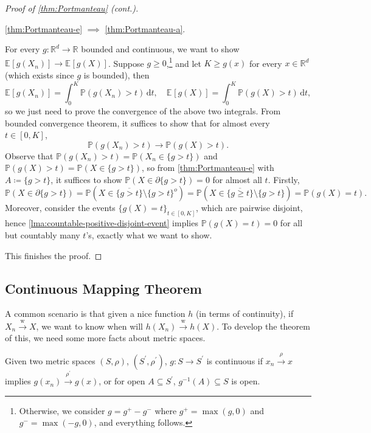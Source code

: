 \begin{proof}[Proof of \autoref{thm:Portmanteau} (cont.)]
	\begin{claim}
		\autoref{thm:Portmanteau-e} \(\implies \) \autoref{thm:Portmanteau-a}.
	\end{claim}
	\begin{explanation}
		For every \(g \colon \mathbb{R} ^d \to \mathbb{R} \) bounded and continuous, we want to show \(\mathbb{E}_{}\left[g(X_n) \right] \to \mathbb{E}_{}\left[g(X) \right] \). Suppose \(g \geq 0\),\footnote{Otherwise, we consider \(g = g^+ - g^-\) where \(g^+ = \max (g, 0)\) and \(g^- = \max (-g, 0)\), and everything follows.} and let \(K \geq g(x)\) for every \(x \in \mathbb{R} ^d\) (which exists since \(g\) is bounded), then
		\[
			\mathbb{E}_{}\left[g(X_n) \right]
			= \int_{0}^{K} \mathbb{P} (g(X_n) > t) \,\mathrm{d}t , \quad
			\mathbb{E}_{}\left[g(X) \right]
			= \int_{0}^{K} \mathbb{P} (g(X) > t) \,\mathrm{d}t,
		\]
		so we just need to prove the convergence of the above two integrals. From bounded convergence theorem, it suffices to show that for almost every \(t \in [0, K]\),
		\[
			\mathbb{P} (g(X_n) > t) \to \mathbb{P} (g(X) > t).
		\]
		Observe that \(\mathbb{P} (g(X_n) > t) = \mathbb{P} (X_n \in \{ g > t \} )\) and \(\mathbb{P} (g(X) > t) = \mathbb{P} (X \in \{ g > t \} )\), so from \autoref{thm:Portmanteau-e} with \(A\coloneqq \{ g > t \} \), it suffices to show \(\mathbb{P} (X \in \partial \{ g > t \} ) = 0\) for almost all \(t\). Firstly,
		\[
			\mathbb{P} (X \in \partial \{ g > t \} )
			= \mathbb{P} (X \in \overline{\{ g > t \} } \setminus \{ g > t \}^o )
			= \mathbb{P} (X \in \overline{\{ g \geq t \} } \setminus \{ g > t \} )
			= \mathbb{P} (g(X) = t ).
		\]
		Moreover, consider the events \(\{ g(X) = t \} _{t \in [0, K]}\), which are pairwise disjoint, hence \autoref{lma:countable-positive-disjoint-event} implies \(\mathbb{P} (g(X) = t) = 0\) for all but countably many \(t\)'s, exactly what we want to show.
	\end{explanation}
	This finishes the proof.
\end{proof}

\subsection{Continuous Mapping Theorem}
A common scenario is that given a nice function \(h\) (in terms of continuity), if \(X_n \overset{\text{w} }{\to } X\), we want to know when will \(h(X_n) \overset{\text{w} }{\to } h(X)\). To develop the theorem of this, we need some more facts about metric spaces.

\begin{prev}
	Given two metric spaces \((S, \rho )\), \((S^{\prime} , \rho ^{\prime} )\), \(g\colon S \to S^{\prime} \) is continuous if \(x_n \overset{\rho }{\to } x\) implies \(g(x_n) \overset{\rho ^{\prime} }{\to } g(x)\), or for open \(A \subseteq S^{\prime} \), \(g^{-1} (A) \subseteq S\) is open.
\end{prev}


